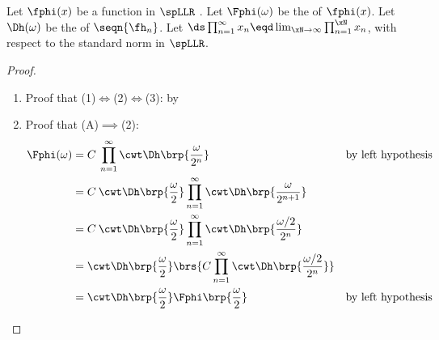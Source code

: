 \begin{lemma}
\label{lem:Fphi_infty}
Let $\fphi(x)$ be a function in $\spLLR$ .
Let $\Fphi(\omega)$ be the of $\fphi(x)$.
Let $\Dh(\omega)$ be the  of $\seqn{\fh_n}$.
Let $\ds\prod_{n=1}^\infty x_n \eqd \lim_{\xN\to\infty}\prod_{n=1}^\xN x_n$, with respect to the standard norm in $\spLLR$.

\end{lemma}
\begin{proof}
  \begin{enumerate}
    \item Proof that (1)$\iff$(2)$\iff$(3): by 
    \item Proof that (A)$\implies$(2):
      \begin{align*}
        \Fphi(\omega)
          &= C\:\prod_{n=1}^{\infty} \cwt \Dh\brp{\frac{\omega}{2^n}}
          && \text{by left hypothesis}
        \\&= C\:\cwt \Dh\brp{\frac{\omega}{2}} \prod_{n=1}^{\infty} \cwt \Dh\brp{\frac{\omega}{2^{n+1}}}
        \\&= C\:\cwt \Dh\brp{\frac{\omega}{2}} \prod_{n=1}^{\infty} \cwt \Dh\brp{\frac{\omega/2}{2^{n}}}
        \\&= \cwt \Dh\brp{\frac{\omega}{2}}\brs{C\prod_{n=1}^{\infty} \cwt \Dh\brp{\frac{\omega/2}{2^{n}}}}
        \\&= \cwt \Dh\brp{\frac{\omega}{2}} \Fphi\brp{\frac{\omega}{2}}
          && \text{by left hypothesis}
      \end{align*}
  \end{enumerate}
\end{proof}


